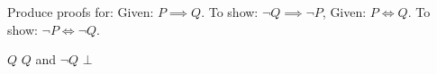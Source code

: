 \documentclass{report}
\begin{document}
\begin{Exercise} [number=7]
  Produce proofs for:
  \Question Given: $P \implies Q$. To show: $\neg{Q} \implies \neg{P}$,
  \Question Given: $P \iff Q$. To show: $\neg{P} \iff \neg{Q}$.
\end{Exercise}

\begin{Answer} [number=7.1]
  \begin{structured_derivation}
    \begin{nested_derivation}
      \begin{nested_derivation}
        \observation
          {}
          {$Q$}
        \observation
          {$Q$ and $\neg{Q}$}
          {$\bot$}
      \end{nested_derivation}
    \end{nested_derivation}
  \end{structured_derivation}
\end{Answer}
\end{document}
